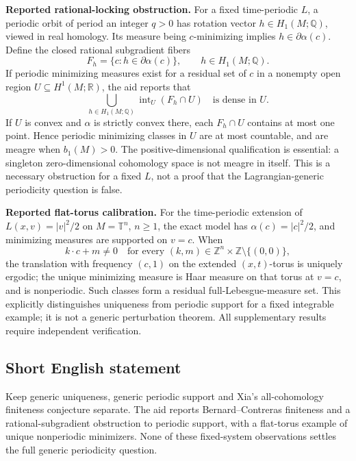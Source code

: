 \documentclass[11pt]{article}
\newcommand{\Z}{\mathbb{Z}}
\newcommand{\Q}{\mathbb{Q}}
\newcommand{\R}{\mathbb{R}}
\begin{document}
\textbf{Reported rational-locking obstruction.} For a fixed time-periodic \(L\), a periodic orbit of period an integer \(q>0\) has rotation vector \(h\in H_1(M;\Q)\), viewed in real homology. Its measure being \(c\)-minimizing implies \(h\in\partial\alpha(c)\). Define the closed rational subgradient fibers
\[
 F_h=\{c:h\in\partial\alpha(c)\},\qquad h\in H_1(M;\Q).
\]
If periodic minimizing measures exist for a residual set of \(c\) in a nonempty open region \(U\subseteq H^1(M;\R)\), the aid reports that
\[
 \bigcup_{h\in H_1(M;\Q)}\operatorname{int}_U(F_h\cap U)
 \quad\text{is dense in }U.
\]
If \(U\) is convex and \(\alpha\) is strictly convex there, each \(F_h\cap U\) contains at most one point. Hence periodic minimizing classes in \(U\) are at most countable, and are meagre when \(b_1(M)>0\). The positive-dimensional qualification is essential: a singleton zero-dimensional cohomology space is not meagre in itself. This is a necessary obstruction for a fixed \(L\), not a proof that the Lagrangian-generic periodicity question is false.

\textbf{Reported flat-torus calibration.} For the time-periodic extension of \(L(x,v)=|v|^2/2\) on \(M=\mathbb T^n\), \(n\geq1\), the exact model has \(\alpha(c)=|c|^2/2\), and minimizing measures are supported on \(v=c\). When
\[
 k\cdot c+m\ne0\quad\text{for every }(k,m)\in\Z^n\times\Z\setminus\{(0,0)\},
\]
the translation with frequency \((c,1)\) on the extended \((x,t)\)-torus is uniquely ergodic; the unique minimizing measure is Haar measure on that torus at \(v=c\), and is nonperiodic. Such classes form a residual full-Lebesgue-measure set. This explicitly distinguishes uniqueness from periodic support for a fixed integrable example; it is not a generic perturbation theorem. All supplementary results require independent verification.
\subsection{Short English statement}
Keep generic uniqueness, generic periodic support and Xia's all-cohomology finiteness conjecture separate. The aid reports Bernard--Contreras finiteness and a rational-subgradient obstruction to periodic support, with a flat-torus example of unique nonperiodic minimizers. None of these fixed-system observations settles the full generic periodicity question.
\end{document}
